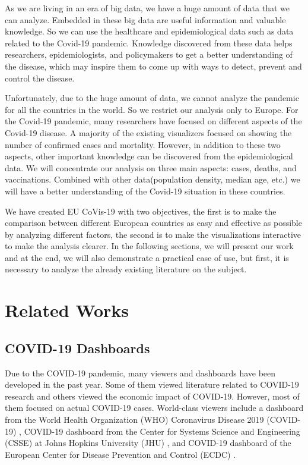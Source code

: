 \documentclass[10pt,conference]{IEEEtran}
\begin{document}
As we are living in an era of big data, we have a huge amount of data that we can analyze. Embedded in these big data are useful information and valuable knowledge. So we can use the healthcare and epidemiological data such as data related to the Covid-19 pandemic. Knowledge discovered from these data helps researchers, epidemiologists, and policymakers to get a better understanding of the disease, which may inspire them to come up with ways to detect, prevent and control the disease.

Unfortunately, due to the huge amount of data, we cannot analyze the pandemic for all the countries in the world. So we restrict our analysis only to Europe. For the Covid-19 pandemic, many researchers have focused on different aspects of the Covid-19 disease. A majority of the existing visualizers focused on showing the number of confirmed cases and mortality. However, in addition to these two aspects, other important knowledge can be discovered from the epidemiological data. We will concentrate our analysis on three main aspects: cases, deaths, and vaccinations. Combined with other data(population density, median age, etc.) we will have a better understanding of the Covid-19 situation in these countries.

We have created EU CoVis-19 with two objectives, the first is to make the comparison between different European countries as easy and effective as possible by analyzing different factors, the second is to make the visualizations interactive to make the analysis clearer. In the following sections, we will present our work and at the end, we will also demonstrate a practical case of use, but first, it is necessary to analyze the already existing literature on the subject.
\smallbreak

\section{Related Works} 

\subsection{COVID-19 Dashboards}
Due to the COVID-19 pandemic, many viewers and dashboards have been developed in the past year. Some of them \cite{vis1, vis2, vis3} 
viewed literature related to COVID-19 research and others \cite{vis4} viewed the economic impact of COVID-19. 
However, most of them \cite{vis5} focused on actual COVID-19 cases. World-class viewers include a dashboard from the World Health 
Organization (WHO) Coronavirus Disease 2019 (COVID-19) \cite{vis6}, COVID-19 dashboard from the Center for Systems Science and Engineering 
(CSSE) at Johns Hopkins University (JHU) \cite{vis7}, and COVID-19 dashboard of the European Center for Disease Prevention and Control (ECDC) \cite{vis8}.
\end{document}
